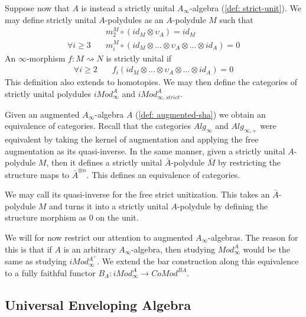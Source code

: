\documentclass[../thesis.tex]{subfiles}
\begin{document}
            Suppose now that $A$ is instead a strictly unital $A_\infty$-algebra (\ref{def: strict-unit}). We may define strictly unital $A$-polydules as an $A$-polydule $M$ such that
            \begin{align*}
                & m^M_2\circ (id_M \otimes \upsilon_A) = id_M \\
                \forall i\geq 3\quad & m^M_i\circ (id_M \otimes ... \otimes \upsilon_A \otimes ... \otimes id_A) = 0
            \end{align*}
            An $\infty$-morphism $f : M \rightsquigarrow N$ is strictly unital if
            \begin{align*}
                \forall i\geq 2 \quad & f_i(id_M \otimes ... \otimes \upsilon_A \otimes ... \otimes id_A) = 0 
            \end{align*}
            This definition also extends to homotopies. We may then define the categories of strictly unital polydules $iMod_\infty^A$ and $iMod_{\infty, strict}^A$.

            Given an augmented $A_\infty$-algebra $A$ (\ref{def: augmented-sha}) we obtain an equivalence of categories. Recall that the categories $Alg_\infty$ and $Alg_{\infty,+}$ were equivalent by taking the kernel of augmentation and applying the free augmentation as its quasi-inverse. In the same manner, given a strictly unital $A$-polydule $M$, then it defines a strictly unital $\bar{A}$-polydule $\bar{M}$ by restricting the structure maps to $\bar{A}^{\otimes n}$. This defines an equivalence of categories.
            \begin{center}
            \end{center}
            We may call its quasi-inverse for the free strict unitization. This takes an $\bar{A}$-polydule $M$ and turns it into a strictly unital $A$-polydule by defining the structure morphism as $0$ on the unit.

            We will for now restrict our attention to augmented $A_\infty$-algebras. The reason for this is that if $A$ is an arbitrary $A_\infty$-algebra, then studying $Mod_\infty^A$ would be the same as studying $iMod_\infty^{A^+}$. We extend the bar construction along this equivalence to a fully faithful functor $B_A : iMod_\infty^A \rightarrow CoMod^{BA}$.

        \subsection{Universal Enveloping Algebra}
\end{document}
